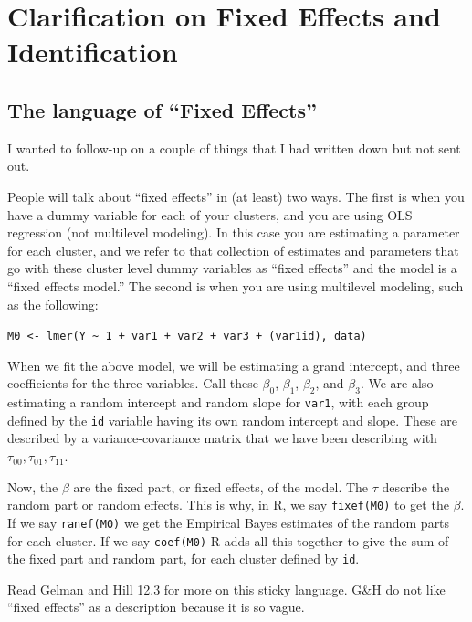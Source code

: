 \documentclass[
  letterpaper,
  DIV=11,
  numbers=noendperiod]{scrreprt}
\begin{document}
\hypertarget{clarification-on-fixed-effects-and-identification}{%
\chapter{Clarification on Fixed Effects and
Identification}\label{clarification-on-fixed-effects-and-identification}}

\hypertarget{the-language-of-fixed-effects}{%
\section{The language of ``Fixed
Effects''}\label{the-language-of-fixed-effects}}

I wanted to follow-up on a couple of things that I had written down but
not sent out.

People will talk about ``fixed effects'' in (at least) two ways. The
first is when you have a dummy variable for each of your clusters, and
you are using OLS regression (not multilevel modeling). In this case you
are estimating a parameter for each cluster, and we refer to that
collection of estimates and parameters that go with these cluster level
dummy variables as ``fixed effects'' and the model is a ``fixed effects
model.'' The second is when you are using multilevel modeling, such as
the following:

\texttt{M0\ \textless{}-\ lmer(Y\ \textasciitilde{}\ 1\ +\ var1\ +\ var2\ +\ var3\ +\ (var1\textbar{}id),\ data)}

When we fit the above model, we will be estimating a grand intercept,
and three coefficients for the three variables. Call these \(\beta_0\),
\(\beta_1\), \(\beta_2\), and \(\beta_3\). We are also estimating a
random intercept and random slope for \texttt{var1}, with each group
defined by the \texttt{id} variable having its own random intercept and
slope. These are described by a variance-covariance matrix that we have
been describing with \(\tau_{00}, \tau_{01}, \tau_{11}\).

Now, the \(\beta\) are the fixed part, or fixed effects, of the model.
The \(\tau\) describe the random part or random effects. This is why, in
R, we say \texttt{fixef(M0)} to get the \(\beta\). If we say
\texttt{ranef(M0)} we get the Empirical Bayes estimates of the random
parts for each cluster. If we say \texttt{coef(M0)} R adds all this
together to give the sum of the fixed part and random part, for each
cluster defined by \texttt{id}.

Read Gelman and Hill 12.3 for more on this sticky language. G\&H do not
like ``fixed effects'' as a description because it is so vague.
\end{document}
